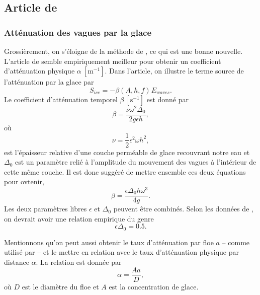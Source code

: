 \documentclass[10pt]{article}
\numberwithin{equation}{section}
\newcommand{\pt}{\hspace{1pt}} %
\begin{document}
\subsection{Article de \Textcite{auclair2022model}}
\label{sec:orgd2a6075}


\subsubsection{Atténuation des vagues par la glace}
\label{sec:orgc36c9b6}
Grossièrement, on s'éloigne de la méthode de \Textcite{Kohout2011wave}, ce qui est une bonne nouvelle.
L'article de \Textcite{sutherland2019two} semble empiriquement meilleur pour obtenir un coefficient d'atténuation physique \(\alpha\ [\mathrm{m}^{-1}]\).
Dans l'article, on illustre le terme source de l'atténuation par la glace par
\begin{equation}
   S_{ice} = - \beta(A,h,f)\pt E_{waves}.
\end{equation}
Le coefficient d'atténuation temporel \(\beta\ [\mathrm{s}^{-1}]\) est donné par 
\begin{equation}
   \beta = \frac{\nu \omega^2 \Delta_0}{2g\epsilon h},
\end{equation}
où
\begin{equation}
   \nu = \frac{1}{2} \epsilon^2 \omega h^2,
\end{equation}
est l'épaisseur relative d'une couche perméable de glace recouvrant notre eau et \(\Delta_0\) est un paramètre relié à l'amplitude du mouvement des vagues à l'intérieur de cette même couche.
Il est donc suggéré de mettre ensemble ces deux équations pour ovtenir,
\begin{equation}
   \beta = \frac{\epsilon \Delta_0 h \omega^3}{4g}.
\end{equation}
Les deux paramètres libres \(\epsilon\) et \(\Delta_0\) peuvent être combinés.
Selon les données de \Textcite{sutherland2019two}, on devrait avoir une relation empirique du genre
\begin{equation}
   \epsilon \Delta_0 = 0.5.
\end{equation}

Mentionnons qu'on peut aussi obtenir le taux d'atténuation par floe \(a\) -- comme utilisé par \Textcite{Kohout2011wave} -- et le mettre en relation avec le taux d'atténuation physique par distance \(\alpha\). 
La relation est donnée par
\begin{equation}
   \alpha = \frac{A a}{D},
\end{equation}
où \(D\) est le diamètre du floe et \(A\) est la concentration de glace.
\end{document}
